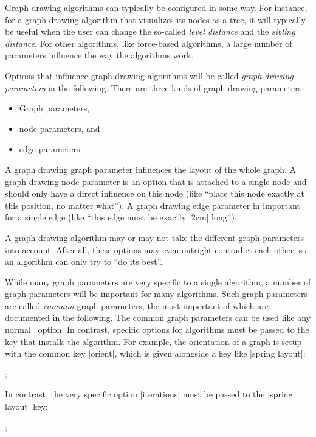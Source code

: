 Graph drawing algorithms can typically be configured in some way. For
instance, for a graph drawing algorithm that visualizes its nodes as a
tree, it will typically be useful when the user can change the
so-called \emph{level distance} and the \emph{sibling distance}. For
other algorithms, like force-based algorithms, a large number of
parameters influence the way the algorithms work.

Options that influence graph drawing algorithms will be called
\emph{graph drawing parameters} in the following. There are three kinds of
graph drawing parameters:
\begin{itemize}
\item Graph parameters,
\item node parameters, and
\item edge parameters.
\end{itemize}
A graph drawing graph parameter influences the layout of the whole
graph. A graph drawing node parameter is an option that is attached to
a single node and should only have a direct influence on this node
(like ``place this node exactly at this position, no matter what''). A
graph drawing edge parameter in important for a single edge (like
``this edge must be exactly |2cm| long'').

A graph drawing algorithm may or may not take the different graph
parameters into account. After all, these options may even outright
contradict each other, so an algorithm can only try to ``do its
best''.

While many graph parameters are very specific to a single algorithm, a
number of graph parameters will be important for many algorithms. Such
graph parameters are called \emph{common} graph parameters, the most
important of which are documented in the following. The common graph
parameters can be used like any normal \tikzname\ option. In contrast,
specific options for algorithms must be passed to the key that
installs the algorithm. For example, the orientation of a graph
is setup with the common key |orient|, which is given alongside a key
like |spring layout|:

\begin{codeexample}[]
\tikz {};  
\end{codeexample}

In contrast, the very specific option |iterations| must be
passed to the |spring layout| key:

\begin{codeexample}[]
\tikz {};  
\end{codeexample}


